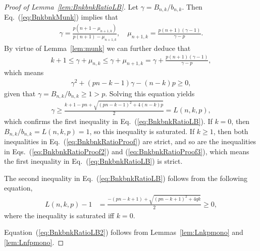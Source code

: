 \documentclass[aop]{imsart}
\theoremstyle{plain}
\theoremstyle{remark}
\newcommand{\1}{\operatorname{\uppercase\expandafter{\romannumeral1}}}
\newcommand{\2}{\operatorname{\uppercase\expandafter{\romannumeral2}}}
\newcommand{\3}{\operatorname{\uppercase\expandafter{\romannumeral3}}}
\newcommand{\4}{\operatorname{\uppercase\expandafter{\romannumeral4}}}
\newcommand{\5}{\operatorname{\uppercase\expandafter{\romannumeral5}}}
\newcommand{\6}{\operatorname{\uppercase\expandafter{\romannumeral6}}}
\newcommand{\7}{\operatorname{\uppercase\expandafter{\romannumeral7}}}
\newcommand{\8}{\operatorname{\uppercase\expandafter{\romannumeral8}}}
\newcommand{\9}{\operatorname{\uppercase\expandafter{\romannumeral9}}}
\newcommand{\eref}[1]{Eq.~\textup{(\ref{#1})}}
\newcommand{\Eref}[1]{Equation~\textup{(\ref{#1})}}
\newcommand{\eqsref}[2]{Eqs.~(\ref{#1}) and (\ref{#2})}
\newcommand{\lref}[1]{Lemma~\ref{#1}}
\newcommand{\lsref}[1]{Lemmas~\ref{#1}}
\begin{document}
\begin{proof}[Proof of \lref{lem:BnkbnkRatioLB}]
	Let $\gamma=B_{n,k}/b_{n,k}$. Then \eref{eq:BnkbnkMunk} implies that 
	\begin{align}
	\gamma=\frac{p(n+1-\mu_{n+1,k})}{p(n+1)-\mu_{n+1,k}},\quad\mu_{n+1,k}=\frac{p(n+1)(\gamma-1)}{\gamma-p}.
	\end{align}
	By virtue of  \lref{lem:munk} we can further deduce that
	\begin{align}
	k+1\leq \gamma+\mu_{n,k} \leq \gamma+\mu_{n+1,k}	=\gamma+\frac{p(n+1)(\gamma-1)}{\gamma-p}, \label{eq:BnkbnkRatioProof}
	\end{align}
	which means 
	\begin{align}
	\gamma^2 +(p n-k-1)\gamma-(n-k)p\geq 0, \label{eq:BnkbnkRatioProof2}
	\end{align}
	given that  $\gamma=B_{n,k}/b_{n,k}\geq 1>p$. Solving this equation yields  
	\begin{align}
	\gamma\geq \frac{k+1-p n+\sqrt{(p n-k-1)^2+4(n-k)p}}{2}=L(n,k,p), \label{eq:BnkbnkRatioProof3}
	\end{align}
	which  confirms the first inequality in \eref{eq:BnkbnkRatioLB}. If $k=0$, then $B_{n,k}/b_{n,k}=L(n,k,p)=1$, so this inequality is saturated. If $k\geq 1$, then both inequalities in \eref{eq:BnkbnkRatioProof} are strict, and so are the inequalities in \eqsref{eq:BnkbnkRatioProof2}{eq:BnkbnkRatioProof3}, which means  the first inequality in \eref{eq:BnkbnkRatioLB} is strict. 
	
	The second  inequality in \eref{eq:BnkbnkRatioLB} follows from  the following equation,
	\begin{align}
	L(n,k,p)-1
	&=\frac{-(p n-k+1)+\sqrt{(p n-k+1)^2+4q k}}{2} \geq 0,
	\end{align}
where the inequality is saturated iff $k=0$.	


\Eref{eq:BnkbnkRatioLB2} follows from \lsref{lem:Lnkpmono} and \ref{lem:Lnfpmono}.
\end{proof}	
\end{document}
